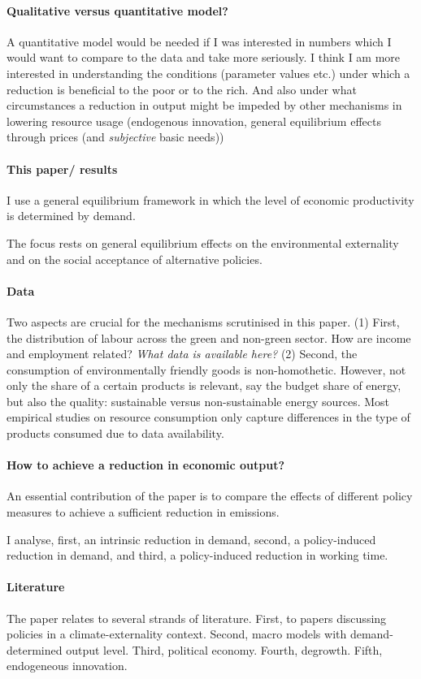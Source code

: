 \paragraph{Qualitative versus quantitative model?}
A quantitative model would be needed if I was interested in numbers which I would want to compare to the data and take more seriously. 
I think I am more interested in understanding the conditions (parameter values etc.) under which a reduction is beneficial to the poor or to the rich. And also under what circumstances a reduction in output might be impeded by other mechanisms in lowering resource usage (endogenous innovation, general equilibrium effects through prices (and \textit{subjective} basic needs))


\paragraph{This paper/ results}
I use a general equilibrium framework in which the level of economic productivity is determined by demand. 

The focus rests on general equilibrium effects on the environmental externality and on the social acceptance of alternative policies. 

\paragraph{Data}
Two aspects are crucial for the mechanisms scrutinised in this paper. (1) First, the distribution of labour across the green and non-green sector. How are income and employment related? \textit{What data is available here?}
(2) Second, the consumption of environmentally friendly goods is non-homothetic. However, not only the share of a certain products is relevant, say the budget share of energy, but also the quality: sustainable versus non-sustainable energy sources.
Most empirical studies on resource consumption only capture differences in the type of products consumed due to data availability. \citep{Sager2019IncomeCurves}

\paragraph{How to achieve a reduction in economic output?}
An essential contribution of the paper is to compare the effects of different policy measures to achieve a sufficient reduction in emissions. 

I analyse, first, an intrinsic reduction in demand, second, a policy-induced reduction in demand, and third, a policy-induced reduction in working time.

\paragraph{Literature}
The paper relates to several strands of literature. First, to papers discussing policies in a climate-externality context. 
Second, macro models with demand-determined output level.
Third, political economy. 
Fourth, degrowth. 
Fifth, endogeneous innovation. 